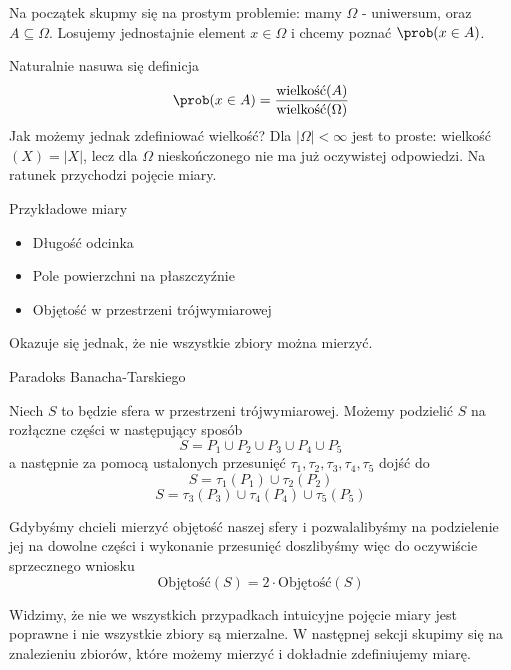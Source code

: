 Na początek skupmy się na prostym problemie: mamy \(\Omega\) - uniwersum, oraz \(A \subseteq \Omega\). Losujemy jednostajnie element \(x \in \Omega\) i chcemy poznać \(\prob(x \in A)\).

Naturalnie nasuwa się definicja
\[
	\prob(x \in A) = \frac{\text{wielkość}(A)}{\text{wielkość}(\Omega)}
\]
Jak możemy jednak zdefiniować wielkość? Dla \(|\Omega| < \infty\) jest to proste: wielkość\((X) = |X|\), lecz dla \(\Omega\) nieskończonego nie ma już oczywistej odpowiedzi. Na ratunek przychodzi pojęcie miary.

\begin{example} Przykładowe miary
	\begin{itemize}
		\item Długość odcinka
		\item Pole powierzchni na płaszczyźnie
		\item Objętość w przestrzeni trójwymiarowej
	\end{itemize}
\end{example}

Okazuje się jednak, że nie wszystkie zbiory można mierzyć.
\begin{example}
	Paradoks Banacha-Tarskiego

	Niech \(S\) to będzie sfera w przestrzeni trójwymiarowej. Możemy podzielić \(S\) na rozłączne części w następujący sposób
	\[
		S = P_1 \cup P_2 \cup P_3 \cup P_4 \cup P_5
	\]
	a następnie za pomocą ustalonych przesunięć \(\tau_1, \tau_2, \tau_3, \tau_4, \tau_5\) dojść do
	\[
		S = \tau_1(P_1) \cup \tau_2(P_2)
	\]
	\[
		S = \tau_3(P_3) \cup \tau_4(P_4) \cup \tau_5(P_5)
	\]

	Gdybyśmy chcieli mierzyć objętość naszej sfery i pozwalalibyśmy na podzielenie jej na dowolne części i wykonanie przesunięć doszlibyśmy więc do oczywiście sprzecznego wniosku
	\[
		\text{Objętość}(S) = 2 \cdot \text{Objętość}(S)
	\]
\end{example}

Widzimy, że nie we wszystkich przypadkach intuicyjne pojęcie miary jest poprawne i nie wszystkie zbiory są mierzalne. W następnej sekcji skupimy się na znalezieniu zbiorów, które możemy mierzyć i dokładnie zdefiniujemy miarę.